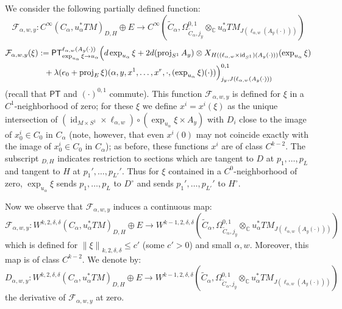 \documentclass[12pt]{article}
\theoremstyle{definition}
\theoremstyle{remark}
\numberwithin{equation}{subsection}
\newcommand{\F}{\mathcal F}
\newcommand{\CC}{\mathbb C}
\newcommand{\PT}{\mathsf{PT}}
\newcommand{\proj}{\operatorname{proj}}
\newcommand{\id}{\operatorname{id}}
\begin{document}
We consider the following partially defined function:
\begin{equation*}
\F_{\alpha,w,y}:C^\infty(C_\alpha,u_\alpha^\ast TM)_{D,H}\oplus E\to C^\infty(\tilde C_\alpha,\Omega^{0,1}_{\tilde C_\alpha,j_y}\otimes_\CC u_\alpha^\ast TM_{J(\ell_{\alpha,w}(A_y(\cdot)))})
\end{equation*}
\vspace{-0.2in}
\begin{multline}\label{FformulaHF}
\F_{\alpha,w,y}(\xi):=\PT_{\exp_{u_\alpha}\xi\to u_\alpha}^{\ell_{\alpha,w}(A_y(\cdot))}\Bigl(d\exp_{u_\alpha}\xi+2d(\proj_{S^1}A_y)\otimes X_{H((\ell_{\alpha,w}\times\id_{S^1})(A_y(\cdot)))}(\exp_{u_\alpha}\xi)\\
{}+\lambda(e_0+\proj_E\xi)(\alpha,y,x^1,\ldots,x^r,\cdot,(\exp_{u_\alpha}\xi)(\cdot))\Bigr)^{0,1}_{j_y,J(\ell_{\alpha,w}(A_y(\cdot)))}
\end{multline}
(recall that $\PT$ and $(\cdot)^{0,1}$ commute).  This function $\F_{\alpha,w,y}$ is defined for $\xi$ in a $C^1$-neighborhood of zero; for these $\xi$ we define $x^i=x^i(\xi)$ as the unique intersection of $(\id_{M\times S^1}\times\ell_{\alpha,w})\circ(\exp_{u_\alpha}\xi\times A_y)$ with $D_i$ close to the image of $x^i_0\in C_0$ in $C_\alpha$ (note, however, that even $x^i(0)$ may not coincide exactly with the image of $x^i_0\in C_0$ in $C_\alpha$); as before, these functions $x^i$ are of class $C^{k-2}$.  The subscript $_{D,H}$ indicates restriction to sections which are tangent to $D$ at $p_1,\ldots,p_L$ and tangent to $H$ at $p_1',\ldots,p_{L'}'$.  Thus for $\xi$ contained in a $C^0$-neighborhood of zero, $\exp_{u_\alpha}\xi$ sends $p_1,\ldots,p_L$ to $D^\circ$ and sends $p_1',\ldots,p_{L'}'$ to $H^\circ$.

Now we observe that $\F_{\alpha,w,y}$ induces a continuous map:
\begin{equation}
\F_{\alpha,w,y}:W^{k,2,\delta,\delta}(C_\alpha,u_\alpha^\ast TM)_{D,H}\oplus E\to W^{k-1,2,\delta,\delta}(\tilde C_\alpha,\Omega^{0,1}_{\tilde C_\alpha,j_y}\otimes_\CC u_\alpha^\ast TM_{J(\ell_{\alpha,w}(A_y(\cdot)))})
\end{equation}
which is defined for $\left\|\xi\right\|_{k,2,\delta,\delta}\leq c'$ (some $c'>0$) and small $\alpha,w$.  Moreover, this map is of class $C^{k-2}$.  We denote by:
\begin{equation}
D_{\alpha,w,y}:W^{k,2,\delta,\delta}(C_\alpha,u_\alpha^\ast TM)_{D,H}\oplus E\to W^{k-1,2,\delta,\delta}(\tilde C_\alpha,\Omega^{0,1}_{\tilde C_\alpha,j_y}\otimes_\CC u_\alpha^\ast TM_{J(\ell_{\alpha,w}(A_y(\cdot)))})
\end{equation}
the derivative of $\F_{\alpha,w,y}$ at zero.
\end{document}
